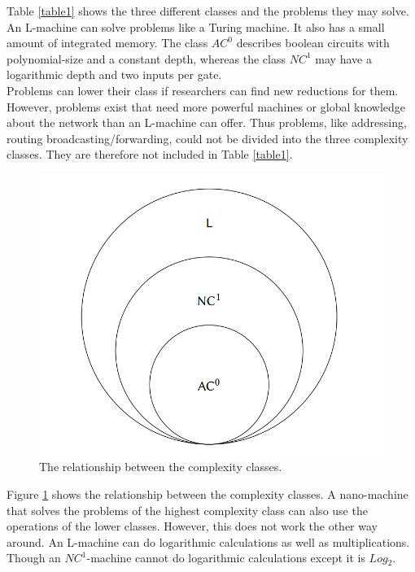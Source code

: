 \documentclass[10pt,sigconf]{acmart}
\begin{document}
Table \ref{table1} shows the three different classes and the problems they may solve.
An L-machine can solve problems like a Turing machine. It also has a small amount of integrated memory.
The class $AC^0$ describes boolean circuits with polynomial-size and a constant depth, whereas the class $NC^1$ may have a logarithmic depth and two inputs per gate.\\ 
Problems can lower their class if researchers can find new reductions for them. 
However, problems exist that need more powerful machines or global knowledge about the network than an L-machine can offer.
Thus problems, like addressing, routing broadcasting/forwarding, could not be divided into the three complexity classes.
They are therefore not included in Table \ref{table1}.\\
\begin{figure}[h!]
  \centering
  \includegraphics[scale=0.35]{ComplexityClasses.PNG}
\caption[The relationship between the complexity classes]{The relationship between the complexity classes. \cite{lau2017computational}}
\label{complex}
\end{figure}
Figure \ref{complex} shows the relationship between the complexity classes.
A nano-machine that solves the problems of the highest complexity class can also use the operations of the lower classes.
However, this does not work the other way around.
An L-machine can do logarithmic calculations as well as multiplications.
Though an $NC^1$-machine cannot do logarithmic calculations except it is \textsc{$Log_{2}$}. \\
\end{document}
